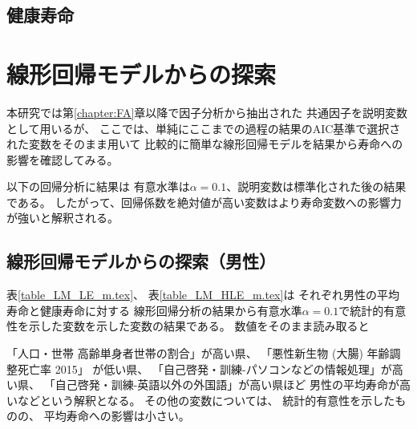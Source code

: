 \documentclass[a4j,11pt,mc]{jreport}
\begin{document}
%
%







\subsection{健康寿命}

\lipsum[2]









%


\section{線形回帰モデルからの探索}

本研究では第\ref{chapter:FA}章以降で因子分析から抽出された
共通因子を説明変数として用いるが、
ここでは、単純にここまでの過程の結果のAIC基準で選択された変数をそのまま用いて
比較的に簡単な線形回帰モデルを結果から寿命への影響を確認してみる。

以下の回帰分析に結果は
有意水準は$\alpha=0.1$、説明変数は標準化された後の結果である。
したがって、回帰係数を絶対値が高い変数はより寿命変数への影響力が強いと解釈される。

\subsection{線形回帰モデルからの探索（男性）}

表\ref{table_LM_LE_m.tex}、
表\ref{table_LM_HLE_m.tex}は
それぞれ男性の平均寿命と健康寿命に対する
線形回帰分析の結果から有意水準$\alpha=0.1$で統計的有意性を示した変数を示した変数の結果である。
数値をそのまま読み取ると

「人口・世帯 高齢単身者世帯の割合」が高い県、
「悪性新生物 (大腸) 年齢調整死亡率 2015」
が低い県、
「自己啓発・訓練-パソコンなどの情報処理」が高い県、
「自己啓発・訓練-英語以外の外国語」が高い県ほど
男性の平均寿命が高いなどという解釈となる。
その他の変数については、
統計的有意性を示したものの、
平均寿命への影響は小さい。
\end{document}
